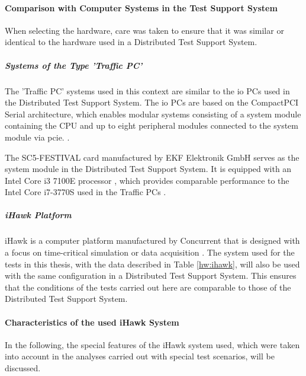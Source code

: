 \paragraph{Comparison with Computer Systems in the Test Support System}
When selecting the hardware, care was taken to ensure that it was similar or identical to the hardware used in a Distributed Test Support System.

\subparagraph{Systems of the Type 'Traffic PC'}
The 'Traffic PC' systems used in this context are similar to the \ac{io} PCs used in the Distributed Test Support System. The \ac{io} PCs are based on the CompactPCI Serial architecture, which enables modular systems consisting of a system module containing the \ac{CPU} and up to eight peripheral modules connected to the system module via \ac{pcie}. \cite{setup01}.

The SC5-FESTIVAL card manufactured by EKF Elektronik GmbH serves as the system module in the Distributed Test Support System. It is equipped with an Intel Core i3 7100E processor \cite{setup02}, which provides comparable performance to the Intel Core i7-3770S used in the Traffic PCs \cite{setup03}.

\subparagraph{iHawk Platform}
iHawk is a computer platform manufactured by Concurrent that is designed with a focus on time-critical simulation or data acquisition \cite{setup04}. The system used for the tests in this thesis, with the data described in Table \ref{hw:ihawk}, will also be used with the same configuration in a Distributed Test Support System. This ensures that the conditions of the tests carried out here are comparable to those of the Distributed Test Support System.


\paragraph{Characteristics of the used iHawk System} \label{chap:iHawkChar}
In the following, the special features of the iHawk system used, which were taken into account in the analyses carried out with special test scenarios, will be discussed.

